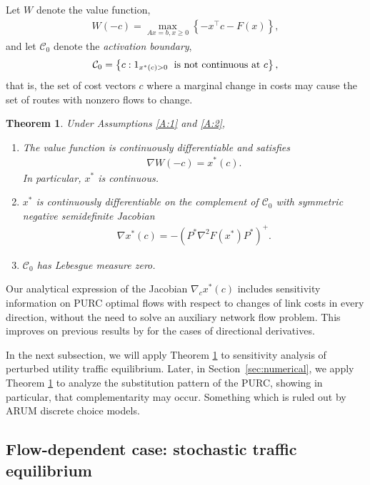 \documentclass[a4paper,11pt]{article}
\newtheorem{theorem}{Theorem}
\begin{document}
Let $W$ denote the value function,
\begin{eqnarray}
    W(-c)=\max_{Ax=b, x\geq 0}\left\{ -x^\top c-F(x)\right\},
\end{eqnarray}
and let $\mathcal{C}_0$ denote the \textit{activation boundary},
\begin{eqnarray}
    \mathcal{C}_0=\left\{ c:1_{x^*(c)>0} \textrm{\; is not continuous at $c$} \right\},
\end{eqnarray}
that is, the set of cost vectors $c$ where a marginal change in costs may cause the set of routes with nonzero flows to change.

\begin{theorem}\label{thm:jacobian} Under Assumptions \ref{A:1} and \ref{A:2}, 
\begin{enumerate}
    \item  The value function is continuously differentiable and satisfies
\begin{eqnarray}\label{eq:Roys}
    \nabla W(-c)=x^*(c).
\end{eqnarray}
In particular, $x^*$ is continuous.
    \item $x^*$ is continuously differentiable on the complement of $\mathcal{C}_0$ with symmetric negative semidefinite Jacobian
    \begin{eqnarray}\label{eq:eqngradient}
        \nabla x^*(c)=-\left(P^*\nabla^2F(x^*)P^*\right)^+.
    \end{eqnarray}
    \item $\mathcal{C}_0$ has Lebesgue measure zero.
\end{enumerate}
\end{theorem}


Our analytical expression of the Jacobian $\nabla_c x^*(c)$ includes sensitivity information on PURC optimal flows with respect to changes of link costs in every direction, without the need to solve an auxiliary network flow problem. This improves on previous results by  \cite{kyparisis1990solution,patriksson_sensitivity_2004} for the cases of directional derivatives. 

In the next subsection, we will apply Theorem \ref{thm:jacobian} to sensitivity analysis of perturbed utility traffic equilibrium. Later, in Section~\ref{sec:numerical}, we apply Theorem \ref{thm:jacobian} to analyze the substitution pattern of the PURC, showing in particular, that complementarity may occur. Something which is ruled out by ARUM discrete choice models.


\subsection{Flow-dependent case: stochastic traffic equilibrium}
\end{document}
